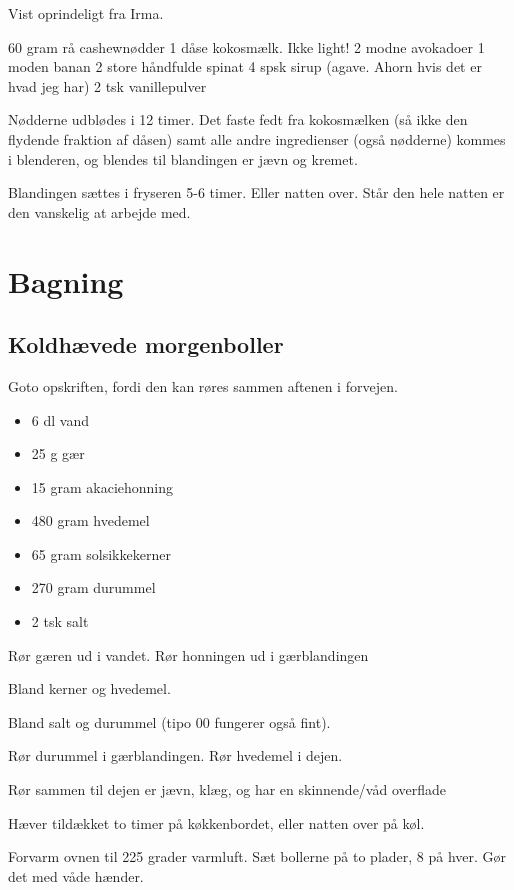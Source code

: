 \documentclass[
]{book}
\providecommand{\tightlist}{%
  \setlength{\itemsep}{0pt}\setlength{\parskip}{0pt}}
\begin{document}
Vist oprindeligt fra Irma.

60 gram rå cashewnødder
1 dåse kokosmælk. Ikke light!
2 modne avokadoer
1 moden banan
2 store håndfulde spinat
4 spsk sirup (agave. Ahorn hvis det er hvad jeg har)
2 tsk vanillepulver

Nødderne udblødes i 12 timer. Det faste fedt fra kokosmælken (så ikke den flydende fraktion af dåsen) samt alle andre ingredienser (også nødderne) kommes i blenderen, og blendes til blandingen er jævn og kremet.

Blandingen sættes i fryseren 5-6 timer. Eller natten over. Står den hele natten er den vanskelig at arbejde med.

\chapter{Bagning}\label{bagning}

\section{Koldhævede morgenboller}\label{koldhuxe6vede-morgenboller}

Goto opskriften, fordi den kan røres sammen aftenen i forvejen.

\begin{itemize}
\tightlist
\item
  6 dl vand
\item
  25 g gær
\item
  15 gram akaciehonning
\item
  480 gram hvedemel
\item
  65 gram solsikkekerner
\item
  270 gram durummel
\item
  2 tsk salt
\end{itemize}

Rør gæren ud i vandet.
Rør honningen ud i gærblandingen

Bland kerner og hvedemel.

Bland salt og durummel (tipo 00 fungerer også fint).

Rør durummel i gærblandingen.
Rør hvedemel i dejen.

Rør sammen til dejen er jævn, klæg, og har en skinnende/våd
overflade

Hæver tildækket to timer på køkkenbordet, eller natten over
på køl.

Forvarm ovnen til 225 grader varmluft. Sæt bollerne på to
plader, 8 på hver. Gør det med våde hænder.
\end{document}
